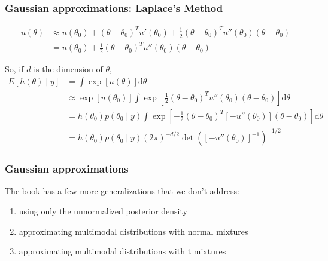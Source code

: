 \documentclass{beamer}
\begin{document}
\begin{frame}[fragile]
\frametitle{Gaussian approximations: Laplace's Method}


\begin{align*}
u(\theta) &\approx u(\theta_0) + (\theta - \theta_0)^Tu'(\theta_0) + \frac{1}{2}(\theta - \theta_0)^T u''(\theta_0)(\theta - \theta_0) \\
&= u(\theta_0) + \frac{1}{2}(\theta - \theta_0)^T u''(\theta_0)(\theta - \theta_0)
\end{align*}

So, if $d$ is the dimension of $\theta$,
\begin{align*}
E[h(\theta) \mid y] &= \int \exp\left[ u(\theta)\right] \text{d}\theta \\
&\approx \exp\left[ u(\theta_0)\right] \int\exp\left[ \frac{1}{2}(\theta - \theta_0)^T u''(\theta_0)(\theta - \theta_0)\right] \text{d}\theta \\
&= h(\theta_0)p(\theta_0 \mid y) \int\exp\left[ - \frac{1}{2}(\theta - \theta_0)^T\left[- u''(\theta_0)\right](\theta - \theta_0)\right] \text{d}\theta \\
&= h(\theta_0)p(\theta_0 \mid y) (2 \pi)^{-d/2} \det\left(\left[- u''(\theta_0)\right]^{-1}\right)^{-1/2}
\end{align*}

\end{frame}

\begin{frame}[fragile]
\frametitle{Gaussian approximations}

The book has a few more generalizations that we don't address:

\begin{enumerate}
\item using only the unnormalized posterior density
\item approximating multimodal distributions with normal mixtures
\item approximating multimodal distributions with t mixtures
\end{enumerate}

\end{frame}
\end{document}

